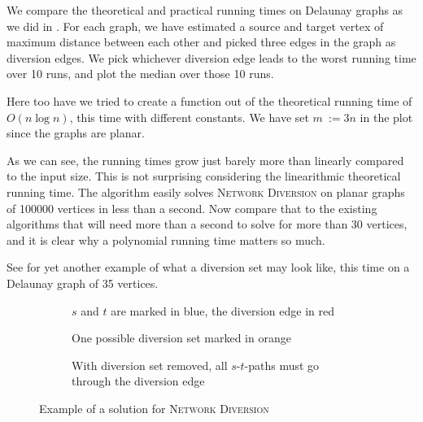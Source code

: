 We compare the theoretical and practical running times on Delaunay graphs as we did in . For each graph, we have estimated a source and target vertex of maximum distance between each other and picked three edges in the graph as diversion edges. We pick whichever diversion edge leads to the worst running time over 10 runs, and plot the median over those 10 runs.

Here too have we tried to create a function out of the theoretical running time of $O(n \log n)$, this time with different constants. We have set $m~:= 3n$ in the plot since the graphs are planar.

\begin{center}
        
\end{center}

As we can see, the running times grow just barely more than linearly compared to the input size. This is not surprising considering the linearithmic theoretical running time. The algorithm easily solves \textsc{Network Diversion} on planar graphs of 100000 vertices in less than a second. Now compare that to the existing algorithms that will need more than a second to solve for more than 30 vertices, and it is clear why a polynomial running time matters so much.

See  for yet another example of what a diversion set may look like, this time on a Delaunay graph of 35 vertices.

\noindent
\begin{figure}
    \centering
    \begin{subfigure}{.32\textwidth}
        \centering
        
        \caption{$s$ and $t$ are marked in blue, the diversion edge in red}
        \label{subfigure:network-diversion-input}
    \end{subfigure}\hfill%
    \begin{subfigure}{.32\textwidth}
        \centering
        
        \caption{One possible diversion set marked in orange}
        \label{subfigure:network-diversion-diversion}
    \end{subfigure}\hfill%
    \begin{subfigure}{.32\textwidth}
        \centering
        
        \caption{With diversion set removed, all $s$-$t$-paths must go through the diversion edge}
        \label{subfigure:network-diversion-diverted}
    \end{subfigure}\hfill%
    \caption{Example of a solution for \textsc{Network Diversion}}
    \label{figure:network-diversion-on-delaunay}
\end{figure}
